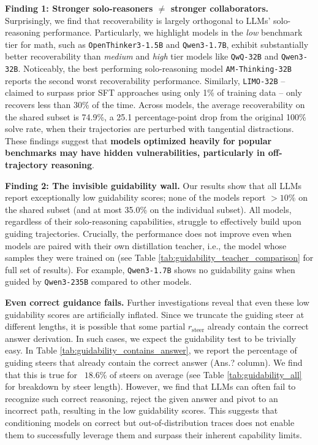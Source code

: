 \documentclass{article} %
\begin{document}
\textbf{Finding 1: Stronger solo-reasoners $\ne$ stronger collaborators.} Surprisingly, we find that recoverability is largely orthogonal to LLMs' solo-reasoning performance. Particularly, we highlight models in the \textit{low} benchmark tier for math, such as \texttt{OpenThinker3-1.5B}  and \texttt{Qwen3-1.7B}, exhibit substantially better recoverability than \textit{medium} and \textit{high} tier models like \texttt{QwQ-32B} and \texttt{Qwen3-32B}. Noticeably, the best performing solo-reasoning model \texttt{AM-Thinking-32B} reports the second worst recoverability performance. Similarly, \texttt{LIMO-32B} -- claimed to surpass prior SFT approaches using only 1\% of training data -- only recovers less than 30\% of the time. Across models, the average recoverability on the shared subset is 74.9\%, a 25.1 percentage-point drop from the original 100\% solve rate, when their trajectories are perturbed with tangential distractions. These findings suggest that \textbf{models optimized heavily for popular benchmarks may have hidden vulnerabilities, particularly in off-trajectory reasoning}.

\textbf{Finding 2: The invisible guidability wall.} Our results show that all LLMs report exceptionally low guidability scores; none of the models report $\!>\!10\%$ on the shared subset (and at most 35.0\% on the individual subset). All models, regardless of their solo-reasoning capabilities, struggle to effectively build upon guiding trajectories. Crucially, the performance does not improve even when models are paired with their own distillation teacher, i.e., the model whose samples they were trained on (see Table \ref{tab:guidability_teacher_comparison} for full set of results). For example, \texttt{Qwen3-1.7B} shows no guidability gains when guided by \texttt{Qwen3-235B} compared to other models.

\textbf{Even correct guidance fails.} Further investigations reveal that even these low guidability scores are artificially inflated. Since we truncate the guiding steer at different lengths, it is possible that some partial $r_\mathrm{steer}$ already contain the correct answer derivation. In such cases, we expect the guidability test to be trivially easy. In Table \ref{tab:guidability_contains_answer}, we report the percentage of guiding steers that already contain the correct answer (Ans.? column). We find that this is true for ~$18.6$\% of steers on average (see Table \ref{tab:guidability_all} for breakdown by steer length). However, we find that LLMs can often fail to recognize such correct reasoning, reject the given answer and pivot to an incorrect path, resulting in the low guidability scores.  This suggests that conditioning models on correct but out-of-distribution traces does not enable them to successfully leverage them and surpass their inherent capability limits.
\end{document}
